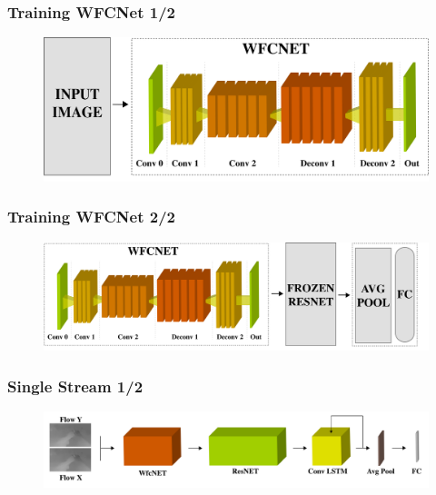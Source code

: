 \documentclass{beamer}
\begin{document}
\begin{frame}
\frametitle{Training WFCNet 1/2}

\begin{figure}
\centering
\includegraphics[height=0.40\textheight]{../schemi/training_WFC1}
\end{figure}
 
\end{frame}

\begin{frame}
\frametitle{Training WFCNet 2/2}

\begin{figure}
\centering
\includegraphics[height=0.40\textheight]{../schemi/training_WFC2}
\end{figure}
 
\end{frame}

\begin{frame}
\frametitle{Single Stream 1/2}

\begin{figure}
\centering
\includegraphics[width=\textwidth]{../schemi/single_stream}
\end{figure}
 
\end{frame}
\end{document}
